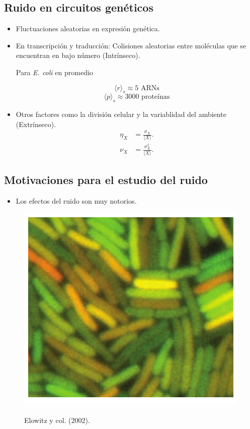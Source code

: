 \documentclass[xcolor=dvipsnames]{beamer}
\begin{document}
\subsection{Ruido en circuitos gen\'eticos}
\begin{frame}
\begin{itemize}
\item Fluctuaciones aleatorias en expresi\'on gen\'etica.
\item En transcripci\'on y traducci\'on: Colisiones aleatorias entre mol\'eculas que se encuentran en bajo n\'umero (Intr\'inseco).

Para \textit{E. coli} en promedio

$$\langle r\rangle_s \approx 5 \text{ ARNs}$$
$$\langle p\rangle_s \approx 3000 \text{ prote\'inas}$$

\item Otros factores como la divisi\'on celular y la variablidad del ambiente (Extr\'inseco).
\begin{align*}
\eta_X &= \frac{\sigma_X}{\langle X \rangle}.\\[1.5ex]
\nu_X &= \frac{\sigma^2_X}{\langle X \rangle}.
\end{align*}
\end{itemize}
\end{frame}

\subsection{Motivaciones para el estudio del ruido}
\begin{frame}

\begin{itemize}
\item Los efectos del ruido son muy notorios.
\end{itemize}

\begin{figure}[p]
    \centering
    \includegraphics[width=.5\textwidth]{int-noise1}~\\
    \tiny Elowitz y col. (2002).
\end{figure}
\end{frame}
\end{document}
